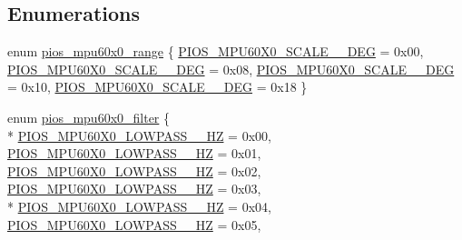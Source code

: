 \subsection*{Enumerations}
\begin{DoxyCompactItemize}
\item 
enum \hyperlink{group___p_i_o_s___m_p_u60_x0_ga56700b0154a14cf67c9f8f44a86ad9c0}{pios\-\_\-mpu60x0\-\_\-range} \{ \hyperlink{group___p_i_o_s___m_p_u60_x0_gga56700b0154a14cf67c9f8f44a86ad9c0a844b5fe3b7c4340fd6b1f787e3562074}{P\-I\-O\-S\-\_\-\-M\-P\-U60\-X0\-\_\-\-S\-C\-A\-L\-E\-\_\-\_\-\-D\-E\-G} = 0x00, 
\hyperlink{group___p_i_o_s___m_p_u60_x0_gga56700b0154a14cf67c9f8f44a86ad9c0aab19279d4ea821210807574a79ea9848}{P\-I\-O\-S\-\_\-\-M\-P\-U60\-X0\-\_\-\-S\-C\-A\-L\-E\-\_\-\_\-\-D\-E\-G} = 0x08, 
\hyperlink{group___p_i_o_s___m_p_u60_x0_gga56700b0154a14cf67c9f8f44a86ad9c0a458ad026c28a005119fa0be6b3cb598b}{P\-I\-O\-S\-\_\-\-M\-P\-U60\-X0\-\_\-\-S\-C\-A\-L\-E\-\_\-\_\-\-D\-E\-G} = 0x10, 
\hyperlink{group___p_i_o_s___m_p_u60_x0_gga56700b0154a14cf67c9f8f44a86ad9c0aee36f45d405393cfda0e34ae3343e82d}{P\-I\-O\-S\-\_\-\-M\-P\-U60\-X0\-\_\-\-S\-C\-A\-L\-E\-\_\-\_\-\-D\-E\-G} = 0x18
 \}
\item 
enum \hyperlink{group___p_i_o_s___m_p_u60_x0_gacce1988bc994f5ade6ac748c2bf0b924}{pios\-\_\-mpu60x0\-\_\-filter} \{ \\*
\hyperlink{group___p_i_o_s___m_p_u60_x0_ggacce1988bc994f5ade6ac748c2bf0b924ae157a08db065baba4dccbcde493815ab}{P\-I\-O\-S\-\_\-\-M\-P\-U60\-X0\-\_\-\-L\-O\-W\-P\-A\-S\-S\-\_\-\_\-\-H\-Z} = 0x00, 
\hyperlink{group___p_i_o_s___m_p_u60_x0_ggacce1988bc994f5ade6ac748c2bf0b924a81f76791864eef8d46b7ed7275f44e43}{P\-I\-O\-S\-\_\-\-M\-P\-U60\-X0\-\_\-\-L\-O\-W\-P\-A\-S\-S\-\_\-\_\-\-H\-Z} = 0x01, 
\hyperlink{group___p_i_o_s___m_p_u60_x0_ggacce1988bc994f5ade6ac748c2bf0b924af6aeb4aea577abd59ca43fad9b3a3ec7}{P\-I\-O\-S\-\_\-\-M\-P\-U60\-X0\-\_\-\-L\-O\-W\-P\-A\-S\-S\-\_\-\_\-\-H\-Z} = 0x02, 
\hyperlink{group___p_i_o_s___m_p_u60_x0_ggacce1988bc994f5ade6ac748c2bf0b924a67da1f1072d9faf4131fa9a75199fc9a}{P\-I\-O\-S\-\_\-\-M\-P\-U60\-X0\-\_\-\-L\-O\-W\-P\-A\-S\-S\-\_\-\_\-\-H\-Z} = 0x03, 
\\*
\hyperlink{group___p_i_o_s___m_p_u60_x0_ggacce1988bc994f5ade6ac748c2bf0b924a062161a90f5707cb119593aea0f93b70}{P\-I\-O\-S\-\_\-\-M\-P\-U60\-X0\-\_\-\-L\-O\-W\-P\-A\-S\-S\-\_\-\_\-\-H\-Z} = 0x04, 
\hyperlink{group___p_i_o_s___m_p_u60_x0_ggacce1988bc994f5ade6ac748c2bf0b924a2723be4d8be35f6f275d9fdf0f395e01}{P\-I\-O\-S\-\_\-\-M\-P\-U60\-X0\-\_\-\-L\-O\-W\-P\-A\-S\-S\-\_\-\_\-\-H\-Z} = 0x05, 

\end{DoxyCompactItemize}
